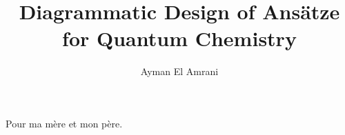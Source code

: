 \documentclass[a4paper,nobind]{ociamthesis}  %
\title{Diagrammatic Design of Ansätze for Quantum Chemistry}
\author{Ayman El Amrani}
\begin{document}
\setlength{\textbaselineskip}{22pt}  %
\setlength{\frontmatterbaselineskip}{17pt plus1pt minus1pt} %
\setlength{\baselineskip}{\textbaselineskip}


\setcounter{secnumdepth}{1}  %
\setcounter{tocdepth}{1}  %


\begin{romanpages}
\maketitle

\begin{dedication}
Pour ma mère et mon père.
\end{dedication}


\begin{abstract}
	
\end{abstract}

\flushbottom  %

\tableofcontents

\end{romanpages}








% 




\end{document}

